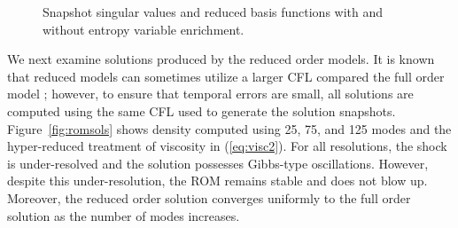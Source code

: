 \documentclass[preprint,10pt]{elsarticle}
\theoremstyle{definition}
\theoremstyle{lemma}
\theoremstyle{theorem}
\theoremstyle{assumption}
\begin{document}
\begin{figure}
\centering
{}
\hspace{.02em}
\hspace{.02em}
\caption{Snapshot singular values and reduced basis functions with and without entropy variable enrichment. }
\label{fig:svd}
\end{figure}

We next examine solutions produced by the reduced order models.  It is known that reduced models can sometimes utilize a larger CFL compared the full order model \cite{lucia2004reduced, knezevic2011reduced}; however, to ensure that temporal errors are small, all solutions are computed using the same CFL used to generate the solution snapshots.  Figure~\ref{fig:romsols} shows density computed using 25, 75, and 125 modes and the hyper-reduced treatment of viscosity in (\ref{eq:visc2}).  For all resolutions, the shock is under-resolved and the solution possesses Gibbs-type oscillations.  However, despite this under-resolution, the ROM remains stable and does not blow up.  Moreover, the reduced order solution converges uniformly to the full order solution as the number of modes increases.  
\end{document}
